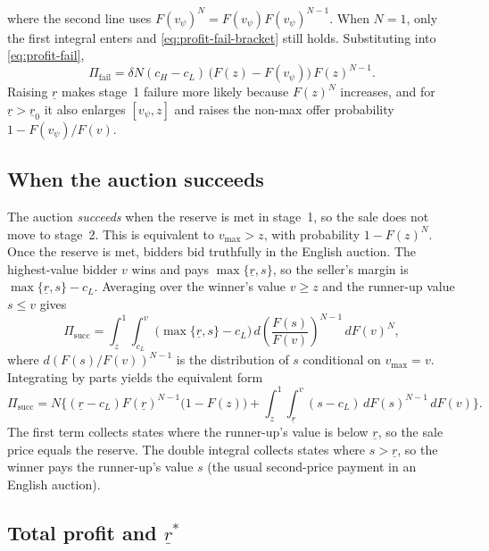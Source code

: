 where the second line uses $F(v_{\psi})^{N}=F(v_{\psi})F(v_{\psi})^{N-1}$.
When $N=1$, only the first integral enters and
\eqref{eq:profit-fail-bracket} still holds.
Substituting into \eqref{eq:profit-fail},
\begin{equation}
  \Pi_{\text{fail}}
  = \delta N (c_H - c_L)\,
    \bigl(F(z) - F(v_{\psi})\bigr)\,
    F(z)^{N-1}.
  \label{eq:profit-fail-closed}
\end{equation}
Raising $\underline{r}$ makes stage~1 failure more likely because $F(z)^{N}$
increases, and for $\underline{r}>\underline{r}_0$ it also enlarges
$[v_{\psi},z]$ and raises the non-max offer probability
$1-F(v_{\psi})/F(v)$.

\subsection{When the auction succeeds}
\label{subsec:profit-success}

The auction \emph{succeeds} when the reserve is met in stage~1, so the sale
does not move to stage~2.
This is equivalent to $v_{\max}>z$, with probability $1-F(z)^{N}$.
Once the reserve is met, bidders bid truthfully in the English auction.
The highest-value bidder $v$ wins and pays $\max\{\underline{r},s\}$, so the
seller's margin is $\max\{\underline{r}, s\} - c_L$.
Averaging over the winner's value $v\ge z$ and the runner-up value $s\le v$ gives
\begin{equation}
  \Pi_{\text{succ}}
  = \int_{z}^{1}
    \int_{c_L}^{v}
      \bigl(\max\{\underline{r}, s\} - c_L\bigr)
      \, d\!\left(\frac{F(s)}{F(v)}\right)^{N-1}
    \, dF(v)^{N},
  \label{eq:profit-success-int}
\end{equation}
where $d(F(s)/F(v))^{N-1}$ is the distribution of $s$ conditional on
$v_{\max}=v$.
Integrating by parts yields the equivalent form
\begin{equation}
  \Pi_{\text{succ}}
  = N \Biggl\{
    (\underline{r} - c_L) F(\underline{r})^{N-1}
      \bigl(1 - F(z)\bigr)
    + \int_{z}^{1}
      \int_{\underline{r}}^{v} (s - c_L)\, dF(s)^{N-1}
      \, dF(v)
  \Biggr\}.
  \label{eq:profit-success}
\end{equation}
The first term collects states where the runner-up's value is below
$\underline{r}$, so the sale price equals the reserve. The double integral
collects states where $s>\underline{r}$, so the winner pays the runner-up's
value $s$ (the usual second-price payment in an English auction).

\subsection{Total profit and \texorpdfstring{$\underline{r}^{*}$}{underline r star}}
\label{subsec:total-profit}

